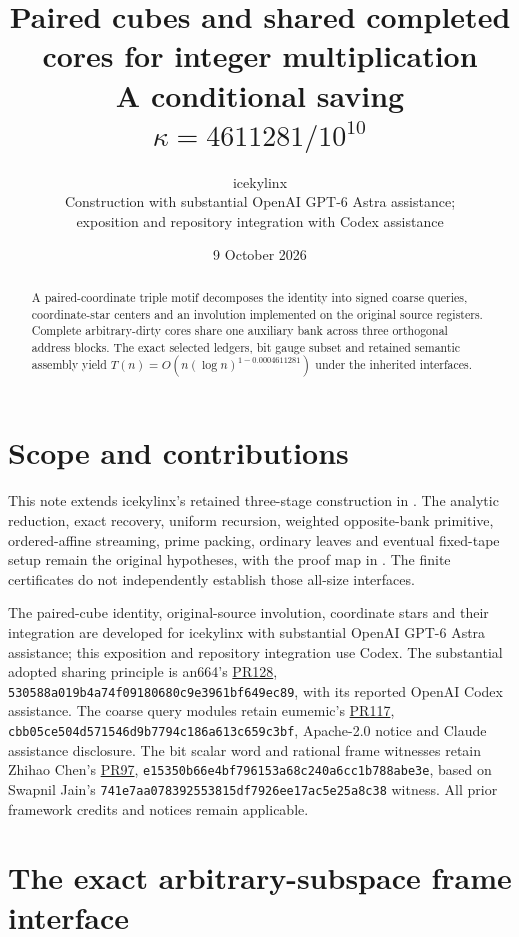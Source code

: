 \documentclass[11pt]{article}
\title{Paired cubes and shared completed cores for integer multiplication\\
\large A conditional saving $\kappa=4611281/10^{10}$}
\author{icekylinx\\\small Construction with substantial OpenAI GPT-6 Astra assistance;\\
\small exposition and repository integration with Codex assistance}
\date{9 October 2026}
\begin{document}
\maketitle
\begin{abstract}
A paired-coordinate triple motif decomposes the identity into signed
coarse queries, coordinate-star centers and an involution implemented
on the original source registers. Complete arbitrary-dirty cores share
one auxiliary bank across three orthogonal address blocks. The exact
selected ledgers, bit gauge subset and retained semantic assembly yield
$T(n)=O(n(\log n)^{1-0.0004611281})$ under the inherited interfaces.
\end{abstract}

\section{Scope and contributions}
This note extends icekylinx's retained three-stage construction in
. The analytic reduction, exact
recovery, uniform recursion, weighted opposite-bank primitive,
ordered-affine streaming, prime packing, ordinary leaves and eventual
fixed-tape setup remain the original hypotheses, with the proof map in
. The finite certificates do
not independently establish those all-size interfaces.

The paired-cube identity, original-source involution, coordinate stars
and their integration are developed for icekylinx with substantial
OpenAI GPT-6 Astra assistance; this exposition and repository integration
use Codex. The substantial adopted sharing principle is an664's
\href{https://github.com/CrocSwap/integer-mult-bounds/pull/128}{PR128},
\texttt{530588a019b4a74f09180680c9e3961bf649ec89}, with its reported
OpenAI Codex assistance. The coarse query modules retain eumemic's
\href{https://github.com/CrocSwap/integer-mult-bounds/pull/117}{PR117},
\texttt{cbb05ce504d571546d9b7794c186a613c659c3bf}, Apache-2.0 notice
and Claude assistance disclosure. The bit scalar word and rational
frame witnesses retain Zhihao Chen's
\href{https://github.com/CrocSwap/integer-mult-bounds/pull/97}{PR97},
\texttt{e15350b66e4bf796153a68c240a6cc1b788abe3e}, based on Swapnil
Jain's \texttt{741e7aa078392553815df7926ee17ac5e25a8c38} witness.
All prior framework credits and notices remain applicable.

\section{The exact arbitrary-subspace frame interface}

\end{document}
